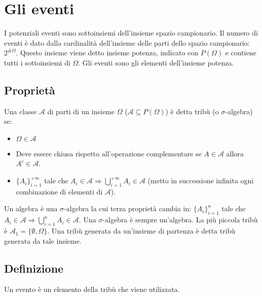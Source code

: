 \section{Gli eventi}
I potenziali eventi sono sottoinsiemi dell'insieme spazio campionario. Il numero di eventi \`e dato dalla cardinalit\`a dell'insieme delle parti dello spazio campionario:
$2^{\#\Omega}$. Questo insieme viene detto insieme potenza, indicato con $P(\Omega)$ e contiene tutti i sottoinsiemi di $\Omega$. Gli eventi sono gli elementi dell'insieme
potenza.
\subsection{Propriet\`a}
Una classe $\mathcal{A}$ di parti di un insieme $\Omega$ ($\mathcal{A}\subseteq P(\Omega)$) \`e detta trib\`u (o $\sigma$-algebra) se:
\begin{itemize}
\item $\Omega\in \mathcal{A}$
\item Deve essere chiusa rispetto all'operazione complementare se $A\in \mathcal{A}$ allora $A^c\in \mathcal{A}$.
\item $\{A_i\}_{i=1}^{+\infty}$ tale che $A_i\in \mathcal{A}\Rightarrow \bigcup\limits_{i=1}^{+\infty}A_i\in \mathcal{A}$ (metto in successione infinita ogni combinazione di elementi di $\mathcal{A}$).
\end{itemize}
Un algebra \`e una $\sigma$-algebra la cui terza propriet\`a cambia in: $\{A_i\}_{i=1}^{n}$ tale che $A_i\in \mathcal{A}\Rightarrow \bigcup\limits_{i=1}^nA_i\in \mathcal{A}$. Una $\sigma$-algebra
\`e sempre un'algebra. La pi\`u piccola trib\`u \`e $\mathcal{A_1}=\{\emptyset,\Omega\}$. Una trib\`u generata da un'insieme di partenza \`e detta trib\`u generata da tale insieme. 
\subsection{Definizione}
Un evento \`e un elemento della trib\`u che viene utilizzata. 
